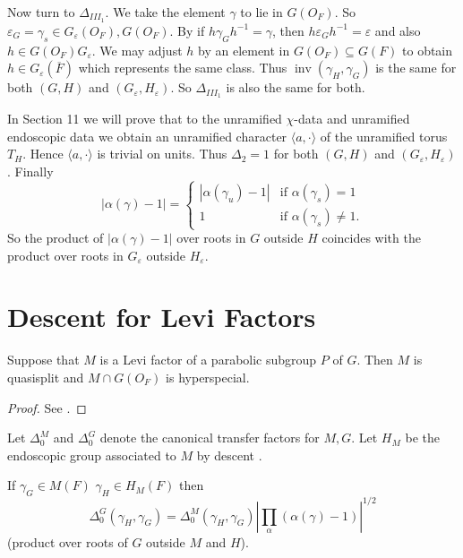 \documentclass{amsart}
\newenvironment{cthm}[1]
  {\renewcommand\thethm{\bf #1}\thm}
  {\endthm}
\def\varep{\varepsilon}
\def\KOTTWITZS{16}
\def\LANGLANDSD{22}
\begin{document}
Now turn to $\Delta_{III_1}$.  We take the element
$\gamma$ to lie in $G(O_F)$.  So
$\varep_G=\gamma_s\in G_\varep(O_F),G(O_F)$.
By \cite {\KOTTWITZS} if $h\gamma_Gh^{-1}=\gamma$,
then $h\varep_Gh^{-1}=\varep$ and also
$h\in G(O_F)G_\varep$.  We may adjust $h$ by
an element in $G(O_F)\subseteq G(F)$ to obtain
$h\in G_\varep(\overline F)$ which represents the
same class.  Thus $\operatorname{inv}(\gamma_H,\gamma_G)$
is the same for both $(G,H)$ and $(G_\varep,H_{\varep})$.
So $\Delta_{III_1}$ is also the same for both.

In Section 11 we will prove that to the unramified $\chi$-data and unramified
endoscopic data we obtain an unramified character
$\langle a,\cdot \rangle$ of the unramified torus
$T_H$.  Hence $\langle a,\cdot \rangle$ is
trivial on units.  Thus
$\Delta_2=1$ for both $(G,H)$ and $(G_\varep,H_\varep)$.
Finally
$$
|\alpha(\gamma)-1|
=\begin{cases}
|\alpha(\gamma_u)-1| &\text{if }\alpha(\gamma_s)=1\\
1 & \text{if }\alpha(\gamma_s) \ne 1.
\end{cases}
$$
So the product of $|\alpha(\gamma)-1|$ over
roots in $G$ outside $H$ coincides with the 
product over roots in $G_\varep$ outside $H_\varep$.

\section{Descent for Levi Factors} %

\begin{cthm}{Lemma 9.1}  Suppose that $M$ is a
Levi factor of a parabolic subgroup $P$ of $G$.
Then $M$  is quasisplit and $M\cap G(O_F)$ is hyperspecial.
\end{cthm}

\begin{proof}  See \cite{\KOTTWITZS}. \end{proof}

Let $\Delta_0^M$ and $\Delta_0^G$ denote
the canonical transfer factors for $M,G$.  Let $H_M$ be the endoscopic
group associated to $M$ by descent \cite{\LANGLANDSD}.

\begin{cthm}{Lemma 9.2}  If $\gamma_G\in M(F)$
$\gamma_H\in H_M(F)$ then
$$
\Delta_0^G(\gamma_H,\gamma_G)
=\Delta_0^M(\gamma_H,\gamma_G)
|\prod_\alpha(\alpha(\gamma)-1)|^{1/2}
$$
(product over roots of $G$ outside $M$ and $H$).
\end{cthm}
\end{document}
